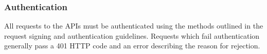 \subsubsection{Authentication}
All requests to the APIs must be authenticated using the methods outlined in the request signing and authentication guidelines. Requests which fail authentication generally pass a 401 HTTP code and an error describing the reason for rejection.

























